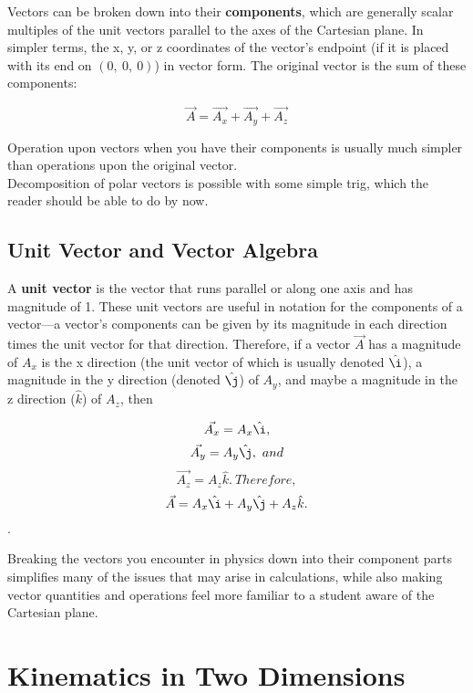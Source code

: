 \documentclass[12pt,letterpaper]{article}
\newcommand{\ihat}{\hat{\i}}
\newcommand{\jhat}{\hat{\j}}
\newcommand{\khat}{\hat{k}}
\begin{document}
Vectors can be broken down into their \textbf{components}, which are generally scalar multiples of the unit vectors parallel to the axes of the Cartesian plane. In simpler terms, the x, y, or z coordinates of the vector's endpoint (if it is placed with its end on $(0,\ 0,\ 0)$) in vector form. The original vector is the sum of these components:

\begin{center}
	$$\vec{A} = \vec{A_{x}} + \vec{A_{y}} + \vec{A_{z}}$$ \linebreak
\end{center}

Operation upon vectors when you have their components is usually much simpler than operations upon the original vector. \\

Decomposition of polar vectors is possible with some simple trig, which the reader should be able to do by now.

\subsection{Unit Vector and Vector Algebra}

A \textbf{unit vector} is the vector that runs parallel or along one axis and has magnitude of 1. These unit vectors are useful in notation for the components of a vector---a vector's components can be given by its magnitude in each direction times the unit vector for that direction. Therefore, if a vector $\vec{A}$ has a magnitude of $A_{x}$ is the x direction (the unit vector of which is usually denoted $\ihat$), a magnitude in the y direction (denoted $\jhat$) of $A_{y}$, and maybe a magnitude in the z direction ($\khat$) of $A_{z}$, then

\begin{center}
	$$\vec{A_{x}} = A_{x}\ihat,$$
	$$\vec{A_{y}} = A_{y}\jhat,\ and$$
	$$\vec{A_{z}} = A_{z}\khat.\ Therefore,$$
	$$\vec{A} = A_{x}\ihat + A_{y}\jhat + A_{z}\khat.$$. \linebreak
\end{center}

Breaking the vectors you encounter in physics down into their component parts simplifies many of the issues that may arise in calculations, while also making vector quantities and operations feel more familiar to a student aware of the Cartesian plane.

\pagebreak

\section{Kinematics in Two Dimensions}
\end{document}

